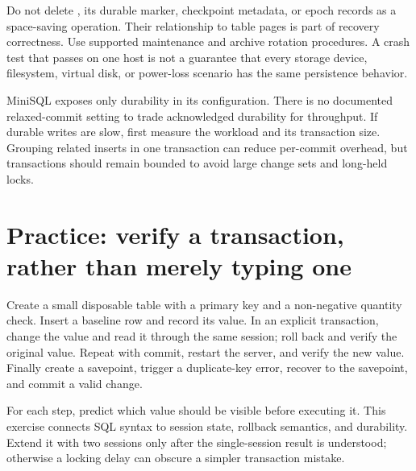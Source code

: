 Do not delete , its durable marker, checkpoint metadata, or
epoch records as a space-saving operation. Their relationship to table pages
is part of recovery correctness. Use supported maintenance and archive
rotation procedures. A crash test that passes on one host is not a guarantee
that every storage device, filesystem, virtual disk, or power-loss scenario
has the same persistence behavior.

MiniSQL exposes only  durability in its configuration. There is
no documented relaxed-commit setting to trade acknowledged durability for
throughput. If durable writes are slow, first measure the workload and its
transaction size. Grouping related inserts in one transaction can reduce
per-commit overhead, but transactions should remain bounded to avoid large
change sets and long-held locks.


\section{Practice: verify a transaction, rather than merely typing one}

Create a small disposable table with a primary key and a non-negative quantity
check. Insert a baseline row and record its value. In an explicit transaction,
change the value and read it through the same session; roll back and verify
the original value. Repeat with commit, restart the server, and verify the
new value. Finally create a savepoint, trigger a duplicate-key error, recover
to the savepoint, and commit a valid change.

For each step, predict which value should be visible before executing it.
This exercise connects SQL syntax to session state, rollback semantics, and
durability. Extend it with two sessions only after the single-session result
is understood; otherwise a locking delay can obscure a simpler transaction
mistake.
